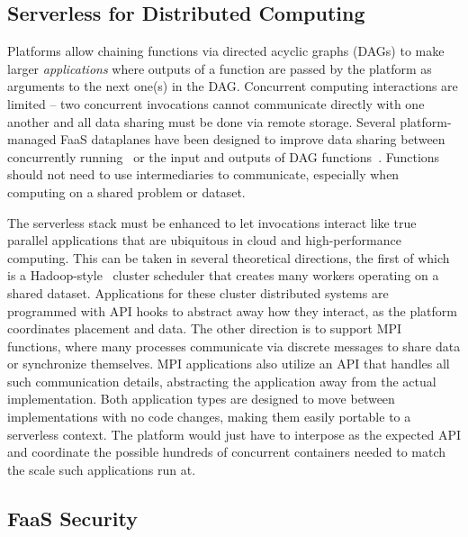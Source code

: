 \subsection{Serverless for Distributed Computing}
\label{sec:new-mpi}

Platforms allow chaining functions via directed acyclic graphs (DAGs) to make larger \emph{applications} where outputs of a function are passed by the platform as arguments to the next one(s) in the DAG.
Concurrent computing interactions are limited -- two concurrent invocations cannot communicate directly with one another and all data sharing must be done via remote storage.
Several platform-managed FaaS dataplanes have been designed to improve data sharing between concurrently running~\cite{giantsidi2023flexlog,sreekanti2020fault} or the input and outputs of DAG functions~\cite{mvondo2021ofc,romero2021faa,abdi2023palette}.
Functions should not need to use intermediaries to communicate, especially when computing on a shared problem or dataset.

The serverless stack must be enhanced to let invocations interact like true parallel applications that are ubiquitous in cloud and high-performance computing.
This can be taken in several theoretical directions, the first of which is a Hadoop-style~\cite{hadoop} cluster scheduler that creates many workers operating on a shared dataset.
Applications for these cluster distributed systems are programmed with API hooks to abstract away how they interact, as the platform coordinates placement and data.
The other direction is to support MPI~\cite{mpi} functions, where many processes communicate via discrete messages to share data or synchronize themselves.
MPI applications also utilize an API that handles all such communication details, abstracting the application away from the actual implementation.
Both application types are designed to move between implementations with no code changes, making them easily portable to a serverless context.
The platform would just have to interpose as the expected API and coordinate the possible hundreds of concurrent containers needed to match the scale such applications run at.

\subsection{FaaS Security}

